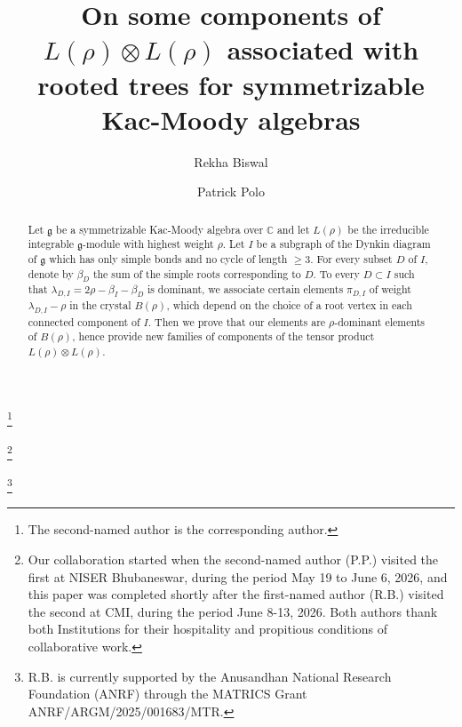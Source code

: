 \documentclass[12pt]{amsart}
\numberwithin{equation}{section}
\theoremstyle{definition}
\begin{document}
\title[Rooted trees and components of $L(\rho)\otimes L(\rho)$]{On some components of $L(\rho)\otimes L(\rho)$ 
associated with rooted trees for symmetrizable Kac-Moody algebras} 

\author{Rekha Biswal} 

\address{School of Mathematical Sciences, NISER, Bhubaneswar 752 050, Odisha, India,  and Homi Bhabha National Institute, Training School Complex, Anushakti Nagar, Mumbai 400094, India}



\author{Patrick Polo} 

 
\address{Institut de Mathématiques de Jussieu\\
Sorbonne Université\\
4, place Jussieu -- Boîte Courrier 247\\
75252 Paris Cedex 05\\
France}



 \thanks{The second-named author is the corresponding author.}

 \thanks{Our collaboration started when the second-named author (P.P.) visited the first at NISER 
Bhubaneswar, during the period May 19 to June 6, 2026, and this paper was completed shortly after the 
first-named author (R.B.) visited the second at CMI, during the period June 8-13, 2026. 
Both authors thank both Institutions for their hospitality and propitious conditions of 
collaborative work.}

\thanks{R.B. is currently supported by the Anusandhan National Research Foundation (ANRF) through the MATRICS Grant ANRF/ARGM/2025/001683/MTR.} 





\begin{abstract} 
Let $\mathfrak{g}$ be a symmetrizable Kac-Moody algebra over 
$\mathbb{C}$ and let $L(\rho)$ be the irreducible integrable 
$\mathfrak{g}$-module with highest weight $\rho$. 
Let $I$ be a subgraph of the Dynkin diagram of $\mathfrak{g}$ 
which has only simple bonds and no cycle of length $\geq 3$. 
For every subset $D$ of $I$, denote by $\beta_D$ the sum of 
the simple roots corresponding to $D$. To every $D \subset I$ 
such that $\lambda_{D,I} = 2\rho - \beta_I - \beta_D$ is dominant, 
we associate certain elements $\pi_{D,I}$ of weight 
$\lambda_{D,I} - \rho$ in the crystal $B(\rho)$, which 
depend on the choice of a root vertex in each connected component 
of $I$. Then we prove that our elements are $\rho$-dominant
 elements of $B(\rho)$, hence provide new families of components 
 of the tensor product  $L(\rho)\otimes L(\rho)$. 
\end{abstract} 
\end{document}
